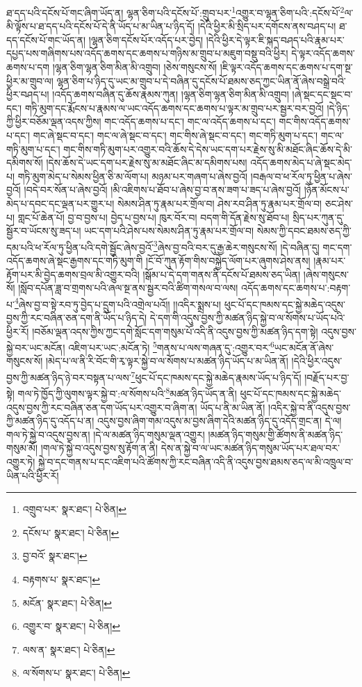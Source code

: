 ཐ་དད་པའི་དངོས་པོ་གང་ཞིག་ཡོད་ན། ལྷན་ཅིག་པའི་དངོས་པོ་:གྲུབ་པར་\footnote{འགྲུབ་པར་  སྣར་ཐང་།  པེ་ཅིན། }འགྱུར་བ་ལྷན་ཅིག་པའི་:དངོས་པོ་\footnote{དངོས་པ་  སྣར་ཐང་།  པེ་ཅིན། }ལ་མི་ལྟོས་པ་ཐ་དད་པའི་དངོས་པོ་དེ་ནི་ཡོད་པ་མ་ཡིན་པ་ཉིད་དོ། །དེའི་ཕྱིར་མི་སྲིད་པར་དགོངས་ནས་བཤད་པ། ཐ་དད་དངོས་པོ་གང་ཡོད་ན། །ལྷན་ཅིག་དངོས་པོར་འདོད་པར་བྱེད། །དེའི་ཕྱིར་དེ་ལྟར་ཇི་སྐད་བཤད་པའི་རྣམ་པར་དཔྱད་པས་གཞིགས་པས་འདོད་ཆགས་དང་ཆགས་པ་གཉིས་མ་གྲུབ་པ་མཇུག་བསྡུ་བའི་ཕྱིར། དེ་ལྟར་འདོད་ཆགས་ཆགས་པ་དག །ལྷན་ཅིག་ལྷན་ཅིག་མིན་མི་འགྲུབ། །ཅེས་གསུངས་སོ། །ཇི་ལྟར་འདོད་ཆགས་དང་ཆགས་པ་དག་སྔ་ཕྱིར་མ་གྲུབ་ལ། ལྷན་ཅིག་པ་ཉིད་དུ་ཡང་མ་གྲུབ་པ་དེ་བཞིན་དུ་དངོས་པོ་ཐམས་ཅད་ཀྱང་ཡིན་ནོ་ཞེས་བསྒྲེ་བའི་ཕྱིར་བཤད་པ། །འདོད་ཆགས་བཞིན་དུ་ཆོས་རྣམས་ཀུན། །ལྷན་ཅིག་ལྷན་ཅིག་མིན་མི་འགྲུབ། །ཞེ་སྡང་དང་སྡང་བ་དང་། གཏི་མུག་དང་རྨོངས་པ་རྣམས་ལ་ཡང་འདོད་ཆགས་དང་ཆགས་པ་ལྟར་མ་གྲུབ་པར་སྦྱར་བར་བྱའོ། །དེ་ཉིད་ཀྱི་ཕྱིར་བཅོམ་ལྡན་འདས་ཀྱིས། གང་འདོད་ཆགས་པ་དང་། གང་ལ་འདོད་ཆགས་པ་དང་། གང་གིས་འདོད་ཆགས་པ་དང་། གང་ཞེ་སྡང་བ་དང་། གང་ལ་ཞེ་སྡང་བ་དང་། གང་གིས་ཞེ་སྡང་བ་དང་། གང་གཏི་མུག་པ་དང་། གང་ལ་གཏི་མུག་པ་དང་། གང་གིས་གཏི་མུག་པར་འགྱུར་བའི་ཆོས་དེ་དེས་ཡང་དག་པར་རྗེས་སུ་མི་མཐོང་ཞིང་ཆོས་དེ་མི་དམིགས་སོ། །དེས་ཆོས་དེ་ཡང་དག་པར་རྗེས་སུ་མ་མཐོང་ཞིང་མ་དམིགས་པས། འདོད་ཆགས་མེད་པ་ཞེ་སྡང་མེད་པ། གཏི་མུག་མེད་པ་སེམས་ཕྱིན་ཅི་མ་ལོག་པ། མཉམ་པར་གཞག་པ་ཞེས་བྱའོ། །བརྒལ་བ་ཕ་རོལ་ཏུ་ཕྱིན་པ་ཞེས་བྱའོ། །བདེ་བར་སོན་པ་ཞེས་བྱའོ། །མི་འཇིགས་པ་ཐོབ་པ་ཞེས་བྱ་བ་ནས་ཟག་པ་ཟད་པ་ཞེས་བྱའོ། །ཉོན་མོངས་པ་མེད་པ་དབང་དང་ལྡན་པར་གྱུར་པ། སེམས་ཤིན་ཏུ་རྣམ་པར་གྲོལ་བ། ཤེས་རབ་ཤིན་ཏུ་རྣམ་པར་གྲོལ་བ། ཅང་ཤེས་པ། གླང་པོ་ཆེན་པོ། བྱ་བ་བྱས་པ། བྱེད་པ་བྱས་པ། ཁུར་བོར་བ། བདག་གི་དོན་རྗེས་སུ་ཐོབ་པ། སྲིད་པར་ཀུན་དུ་སྦྱོར་བ་ཡོངས་སུ་ཟད་པ། ཡང་དག་པའི་ཤེས་པས་སེམས་ཤིན་ཏུ་རྣམ་པར་གྲོལ་བ། སེམས་ཀྱི་དབང་ཐམས་ཅད་ཀྱི་དམ་པའི་ཕ་རོལ་ཏུ་ཕྱིན་པའི་དགེ་སྦྱོང་ཞེས་བྱའོ་\footnote{བྱ་བའོ་  སྣར་ཐང་། }ཞེས་བྱ་བའི་བར་དུ་རྒྱ་ཆེར་གསུངས་སོ། །དེ་བཞིན་དུ། གང་དག་འདོད་ཆགས་ཞེ་སྡང་རྒྱགས་དང་གཏི་མུག་གི །ངོ་བོ་ཀུན་རྟོག་གིས་བསྐྱེད་ལོག་པར་ཞུགས་ཤེས་ནས། །རྣམ་པར་རྟོག་པར་མི་བྱེད་ཆགས་བྲལ་མི་འགྱུར་བའི། །སྒོམ་པ་དེ་དག་གནས་ནི་དངོས་པོ་ཐམས་ཅད་ཡིན། །ཞེས་གསུངས་སོ། །སློབ་དཔོན་ཟླ་བ་གྲགས་པའི་ཞལ་སྔ་ནས་སྦྱར་བའི་ཚིག་གསལ་བ་ལས། འདོད་ཆགས་དང་ཆགས་པ་:བརྟག་པ་\footnote{བརྟགས་པ་  སྣར་ཐང་། }ཞེས་བྱ་བ་སྟེ་རབ་ཏུ་བྱེད་པ་དྲུག་པའི་འགྲེལ་པའོ།། །།འདིར་སྨྲས་པ། ཕུང་པོ་དང་ཁམས་དང་སྐྱེ་མཆེད་འདུས་བྱས་ཀྱི་རང་བཞིན་ཅན་དག་ནི་ཡོད་པ་ཉིད་དེ། དེ་དག་གི་འདུས་བྱས་ཀྱི་མཚན་ཉིད་སྐྱེ་བ་ལ་སོགས་པ་ཡོད་པའི་ཕྱིར་རོ། །བཅོམ་ལྡན་འདས་ཀྱིས་ཀྱང་དགེ་སློང་དག་གསུམ་པོ་འདི་ནི་འདུས་བྱས་ཀྱི་མཚན་ཉིད་དག་སྟེ། འདུས་བྱས་སྐྱེ་བར་ཡང་མངོན། འཇིག་པར་ཡང་:མངོན་ཏེ། \footnote{མངོན་  སྣར་ཐང་།  པེ་ཅིན། }གནས་པ་ལས་གཞན་དུ་:འགྱུར་བར་\footnote{འགྱུར་བ་  སྣར་ཐང་།  པེ་ཅིན། }ཡང་མངོན་ནོ་ཞེས་གསུངས་སོ། །མེད་པ་ལ་ནི་རི་བོང་གི་རྭ་ལྟར་སྐྱེ་བ་ལ་སོགས་པ་མཚན་ཉིད་ཡོད་པ་མ་ཡིན་ནོ། །དེའི་ཕྱིར་འདུས་བྱས་ཀྱི་མཚན་ཉིད་ཉེ་བར་བསྟན་པ་ལས་\footnote{ལས་ན་  སྣར་ཐང་།  པེ་ཅིན། }ཕུང་པོ་དང་ཁམས་དང་སྐྱེ་མཆེད་རྣམས་ཡོད་པ་ཉིད་དོ། །བརྗོད་པར་བྱ་སྟེ། གལ་ཏེ་ཁྱོད་ཀྱི་ལུགས་ལྟར་སྐྱེ་བ་:ལ་སོགས་པའི་\footnote{ལ་སོགས་པ་  སྣར་ཐང་།  པེ་ཅིན། }མཚན་ཉིད་ཡོད་ན་ནི། ཕུང་པོ་དང་ཁམས་དང་སྐྱེ་མཆེད་འདུས་བྱས་ཀྱི་རང་བཞིན་ཅན་དག་ཡོད་པར་འགྱུར་བ་ཞིག་ན། ཡོད་པ་ནི་མ་ཡིན་ནོ། །འདིར་སྐྱེ་བ་ནི་འདུས་བྱས་ཀྱི་མཚན་ཉིད་དུ་འདོད་པ་ན། འདུས་བྱས་ཞིག་གམ་འདུས་མ་བྱས་ཞིག་དེའི་མཚན་ཉིད་དུ་འདོད་གྲང་ན། དེ་ལ། གལ་ཏེ་སྐྱེ་བ་འདུས་བྱས་ན། །དེ་ལ་མཚན་ཉིད་གསུམ་ལྡན་འགྱུར། །མཚན་ཉིད་གསུམ་གྱི་ཚོགས་ནི་མཚན་ཉིད་གསུམ་མོ། །གལ་ཏེ་སྐྱེ་བ་འདུས་བྱས་སུ་རྟོག་ན་ནི། དེས་ན་སྐྱེ་བ་ལ་ཡང་མཚན་ཉིད་གསུམ་ཡོད་པར་ཐལ་བར་འགྱུར་ཏེ། སྐྱེ་བ་དང་གནས་པ་དང་འཇིག་པའི་ཚོགས་ཀྱི་རང་བཞིན་འདི་ནི་འདུས་བྱས་ཐམས་ཅད་ལ་མི་འཁྲུལ་བ་ཡིན་པའི་ཕྱིར་རོ། 